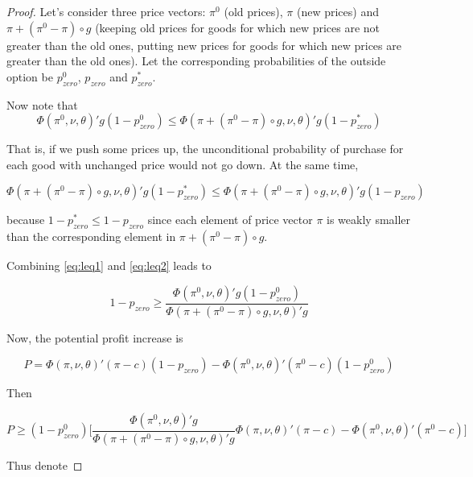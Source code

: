 \documentclass[12pt]{article}
\begin{document}
\begin{proof}
Let's consider three price vectors: $\pi^0$ (old prices), $\pi$ (new prices) and $\pi + (\pi^0 - \pi) \circ g$ (keeping old prices for goods for which new prices are not greater than the old ones, putting new prices for goods for which new prices are greater than the old ones).
Let the corresponding probabilities of the outside option be $p_{zero}^0$, $p_{zero}$ and $p_{zero}^*$.

\par Now note that
\begin{equation}\label{eq:leq1}
\Phi(\pi^0,\nu,\theta)'g(1-p_{zero}^0) \leq \Phi(\pi + (\pi^0 - \pi) \circ g,\nu,\theta)'g(1-p_{zero}^*)
\end{equation}

That is, if we push some prices up, the unconditional probability of purchase for each good with unchanged price would not go down.
At the same time,

\begin{equation}\label{eq:leq2}
\Phi(\pi + (\pi^0 - \pi) \circ g,\nu,\theta)'g(1-p_{zero}^*) \leq \Phi(\pi + (\pi^0 - \pi) \circ g,\nu,\theta)'g(1-p_{zero}) 
\end{equation}

because $1-p_{zero}^* \leq 1-p_{zero}$ since each element of price vector $\pi$ is weakly smaller than the corresponding element in $\pi + (\pi^0 - \pi) \circ g$.

Combining \ref{eq:leq1} and \ref{eq:leq2} leads to 

\begin{equation*}
1-p_{zero} \geq \frac{ \Phi(\pi^0,\nu, \theta)' g (1-p_{zero}^0)}{\Phi(\pi + (\pi^0 - \pi) \circ g,\nu, \theta)' g} 
\end{equation*}

Now, the potential profit increase is 

\begin{equation*}
P = \Phi(\pi,\nu,\theta)'(\pi-c)(1-p_{zero}) - \Phi(\pi^0,\nu,\theta)'(\pi^0-c)(1-p_{zero}^0) 
\end{equation*}

Then 

\begin{equation*}
P \geq (1-p_{zero}^0) \bigg[ \frac{ \Phi(\pi^0,\nu, \theta)' g }{\Phi(\pi + (\pi^0 - \pi) \circ g,\nu, \theta)' g}  \Phi(\pi,\nu,\theta)'(\pi-c) - \Phi(\pi^0,\nu,\theta)'(\pi^0-c) \bigg]
\end{equation*}

Thus denote


\end{proof}
\end{document}
